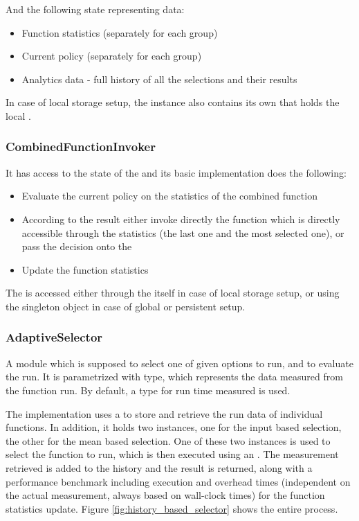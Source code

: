 And the following state representing data:

\begin{itemize}
	\item Function statistics (separately for each group)
	\item Current policy (separately for each group)
	\item Analytics data - full history of all the selections and their results
\end{itemize}

In case of local storage setup, the instance also contains its own  that holds the local .

\subsubsection{CombinedFunctionInvoker}

It has access to the state of the  and its basic implementation does the following:

\begin{itemize}
	\item Evaluate the current policy on the statistics of the combined function
	\item According to the result either invoke directly the function which is directly accessible through the statistics (the last one and the most selected one), or pass the decision onto the 
	\item Update the function statistics
\end{itemize}

The  is accessed either through the  itself in case of local storage setup, or using the singleton object  in case of global or persistent setup.

\subsubsection{AdaptiveSelector}

A module which is supposed to select one of given options to run, and to evaluate the run. It is parametrized with  type, which represents the data measured from the function run. By default, a  type for run time measured is used.

The implementation  uses a  to store and retrieve the run data of individual functions. In addition, it holds two  instances, one for the input based selection, the other for the mean based selection. One of these two instances is used to select the function to run, which is then executed using an . The measurement retrieved is added to the history and the result is returned, along with a performance benchmark including execution and overhead times (independent on the actual measurement, always based on wall-clock times) for the function statistics update. Figure \ref{fig:history_based_selector} shows the entire process.

